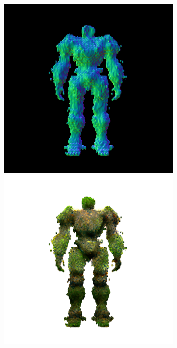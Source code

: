 \begin{figure}[ht]
\begin{subfigure}[b]{0.222\textwidth}
        \includegraphics[width=\textwidth]{figures/appendix/magic123_refine_robot_back_0_part2.png}
        \includegraphics[width=\textwidth]{figures/appendix/magic123_refine_robot_back_0_part1.png}

\end{subfigure}
\end{figure}
